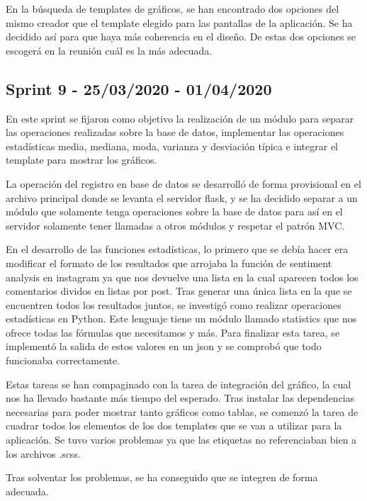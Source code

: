 En la búsqueda de templates de gráficos, se han encontrado dos opciones del mismo creador que el template elegido para las pantallas de la aplicación. Se ha decidido así para que haya más coherencia en el diseño. De estas dos opciones se escogerá en la reunión cuál es la más adecuada.


\subsection{Sprint 9 - 25/03/2020 - 01/04/2020}
En este sprint se fijaron como objetivo la realización de un módulo para separar las operaciones realizadas sobre la base de datos, implementar las operaciones estadísticas media, mediana, moda, varianza y desviación típica e integrar el template para mostrar los gráficos.

La operación del registro en base de datos se desarrolló de forma provisional en el archivo principal donde se levanta el servidor flask, y se ha decidido separar a un módulo que solamente tenga operaciones sobre la base de datos para así en el servidor solamente tener llamadas a otros módulos y respetar el patrón MVC.

En el desarrollo de las funciones estadísticas, lo primero que se debía hacer era modificar el formato de los resultados que arrojaba la función de sentiment analysis en instagram ya que nos devuelve una lista en la cual aparecen todos los comentarios dividos en listas por post.
Tras generar una única lista en la que se encuentren todos los resultados juntos, se investigó como realizar operaciones estadísticas en Python. 
Este lenguaje tiene un módulo llamado statistics que nos ofrece todas las fórmulas que necesitamos y más. 
Para finalizar esta tarea, se implementó la salida de estos valores en un json y se comprobó que todo funcionaba correctamente.

Estas tareas se han compaginado con la tarea de integración del gráfico, la cual nos ha llevado bastante más tiempo del esperado. 
Tras instalar las dependencias necesarias para poder mostrar tanto gráficos como tablas, se comenzó la tarea de cuadrar todos los elementos de los dos templates que se van a utilizar para la aplicación. Se tuvo varios problemas ya que las etiquetas no referenciaban bien a los archivos .scss. 

Tras solventar los problemas, se ha conseguido que se integren de forma adecuada.

